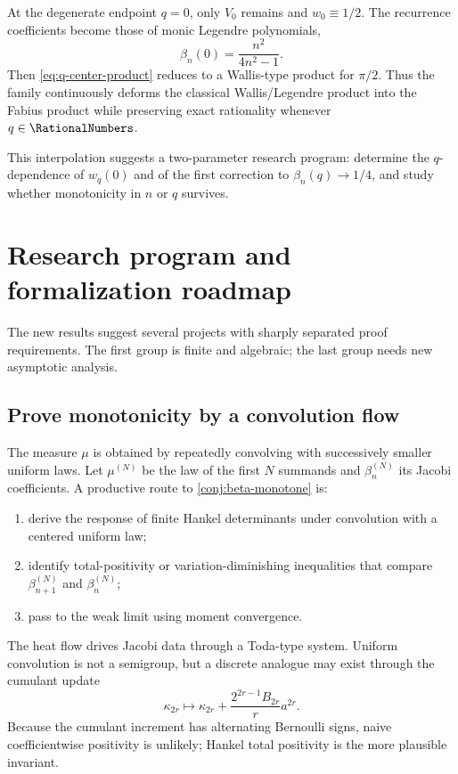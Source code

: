 \documentclass[11pt,oneside]{article}
\theoremstyle{definition}
\theoremstyle{remark}
\numberwithin{equation}{section}
\begin{document}
At the degenerate endpoint $q=0$, only $V_0$ remains and
$w_0\equiv1/2$.  The recurrence coefficients become those of monic Legendre
polynomials,
\begin{equation}
 \beta_n(0)=\frac{n^2}{4n^2-1}.
 \label{eq:legendre-beta}
\end{equation}
Then \cref{eq:q-center-product} reduces to a Wallis-type product for
$\pi/2$.  Thus the family continuously deforms the classical Wallis/Legendre
product into the Fabius product while preserving exact rationality whenever
$q\in\RationalNumbers$.

This interpolation suggests a two-parameter research program: determine the
$q$-dependence of $w_q(0)$ and of the first correction to
$\beta_n(q)\to1/4$, and study whether monotonicity in $n$ or $q$ survives.

\section{Research program and formalization roadmap}
\label{sec:future}

The new results suggest several projects with sharply separated proof
requirements.  The first group is finite and algebraic; the last group needs
new asymptotic analysis.

\subsection{Prove monotonicity by a convolution flow}
The measure $\mu$ is obtained by repeatedly convolving with successively
smaller uniform laws.  Let $\mu^{(N)}$ be the law of the first $N$ summands and
$\beta_n^{(N)}$ its Jacobi coefficients.  A productive route to
\cref{conj:beta-monotone} is:
\begin{enumerate}
\item derive the response of finite Hankel determinants under convolution with
      a centered uniform law;
\item identify total-positivity or variation-diminishing inequalities that
      compare $\beta_{n+1}^{(N)}$ and $\beta_n^{(N)}$;
\item pass to the weak limit using moment convergence.
\end{enumerate}
The heat flow drives Jacobi data through a Toda-type system.  Uniform
convolution is not a semigroup, but a discrete analogue may exist through the
cumulant update
\begin{equation}
 \kappa_{2r}\longmapsto\kappa_{2r}
 +\frac{2^{2r-1}B_{2r}}{r}a^{2r}.
 \label{eq:uniform-cumulant-flow}
\end{equation}
Because the cumulant increment has alternating Bernoulli signs, naive
coefficientwise positivity is unlikely; Hankel total positivity is the more
plausible invariant.
\end{document}
